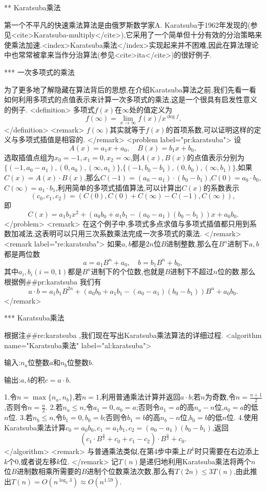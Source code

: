 ** Karatsuba乘法

第一个不平凡的快速乘法算法是由俄罗斯数学家A. Karatsuba于1962年发现的(参见<cite>Karatsuba-multiply</cite>),它采用了一个简单但十分有效的分治策略来使乘法加速.<index>Karatsuba乘法</index>实现起来并不困难,因此在算法理论中也常常被拿来当作分治算法(参见<cite>ita</cite>)的很好例子.

*** 一次多项式的乘法

为了更多地了解隐藏在算法背后的思想,在介绍Karatsuba算法之前,我们先看一看如何利用多项式的点值表示来计算一次多项式的乘法,这是一个很具有启发性意义的例子.
<definition>
多项式$f(x)$在$\infty$处的值定义为$$f(\infty)=\lim_{x\rightarrow\infty}f(x)/x^{\deg{f}}.$$
</definition>
<remark>
$f(\infty)$其实就等于$f(x)$的首项系数,可以证明这样的定义与多项式插值是相容的.
</remark>
<problem label="pr:karatsuba">
设$$A(x)=a_1x+a_0,\quad B(x)=b_1x+b_0,$$选取插值点组为$x_0=-1,x_1=0,x_2=\infty$,则$A(x),B(x)$的点值表示分别为$\{(-1,a_0-a_1),(0,a_0),(\infty,a_1)\}$,$\{(-1,b_0-b_1),(0,b_0),(\infty,b_1)\}$,如果$C(x)=A(x)\cdot B(x)$,那么$C(-1)=(a_0-a_1)\cdot(b_0-b_1)$,$C(0)=a_0\cdot b_0$,$C(\infty)=a_1\cdot b_1$,利用简单的多项式插值算法,可以计算出$C(x)$的系数表示$$(c_0,c_1,c_2)=(C(0),C(0)+C(\infty)-C(-1),C(\infty)),$$即$$C(x)=a_1b_1x^2+(a_0b_0+a_1b_1-(a_0-a_1)(b_0-b_1))x+a_0b_0.$$
</problem>
<remark>
在这个例子中,多项式多点求值与多项式插值都只用到系数加减法,这表明可以只用三次系数乘法完成一次多项式的乘法.
</remark>
<remark label="re:karatsuba">
如果$a,b$都是$2n$位$B$进制整数,那么在$B^n$进制下$a,b$都是两位数$$a=a_1B^n+a_0,\quad b=b_1B^n+b_0,$$其中$a_i,b_i(i=0,1)$都是$B^n$进制下的个位数,也就是$B$进制下不超过$n$位的数.那么根据例##pr:karatsuba 我们有$$a\cdot b=a_1 b_1B^{2n}+(a_0b_0+a_1b_1-(a_0-a_1)(b_0-b_1))B^n+a_0b_0.$$
</remark>

*** Karatsuba乘法

根据注##re:karatsuba ,我们现在写出Karatsuba乘法算法的详细过程.
<algorithm  name="Karatsuba乘法" label="al:karatsuba">

输入:$n_a$位整数$a$和$n_b$位整数$b$.

输出:$a,b$的积$c=a\cdot b$.

 1.令$n=\max\{n_a,n_b\}$,若$n=1$,利用普通乘法计算并返回$a\cdot b$;若$n$为奇数,令$n=\frac{n+1}{2}$,否则令$n=\frac{n}{2}$.
 2.若$n_a\le n$,令$a_1=0,a_0=a$;否则令$a_1=a$的高$n_a-n$位,$a_0=a$的低$n$位.
 3.若$n_b\le n$,令$b_1=0,b_0=b$;否则令$b_1=b$的高$n_b-n$位,$b_0=b$的低$n$位. 
 4.使用Karatsuba乘法计算$c_0=a_0b_0,c_1=a_1b_1,c_2=(a_0-a_1)(b_0-b_1)$,返回$$(c_1\cdot B^{\frac{n}{2}}+c_0+c_1-c_2)\cdot B^{\frac{n}{2}}+c_0.$$
</algorithm>
<remark>
与普通乘法类似,在第4步中乘上$B^k$时只需要在右边添上$k$个0,或者说左移$k$位.
</remark>
记$T(n)$是递归地利用Karatsuba乘法将两个$n$位$B$进制数相乘所需要的$B$进制个位数乘法次数,那么有$T(2n)\le 3T(n)$,由此推出$T(n)=O(n^{\log_2{3}})\approx O(n^{1.59})$.

